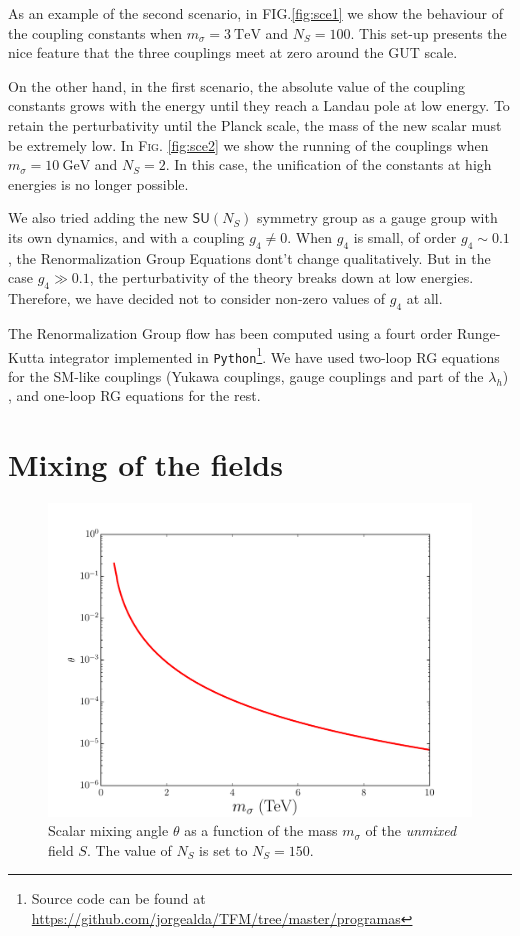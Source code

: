 \documentclass[aps,prd,preprintnumbers,nofootinbibn,twocolumn]{revtex4}
\begin{document}
As an example of the second scenario, in \textsc{FIG.}\ref{fig:sce1} we show the behaviour of the coupling constants when $m_\sigma = \SI{3}{\tera\electronvolt}$ and $N_S = 100$. This set-up presents the nice feature that the three couplings meet at zero around the GUT scale. 



On the other hand, in the first scenario, the absolute value of the coupling constants grows with the energy until they reach a Landau pole at low energy. To retain the perturbativity until the Planck scale, the mass of the new scalar must be extremely low. In \textsc{Fig.} \ref{fig:sce2} we show the running of the couplings when $m_\sigma =\SI{10}{\giga\electronvolt}$ and $N_S = 2$. In this case, the unification of the constants at high energies is no longer possible. 




We also tried adding the new $\mathsf{SU}(N_S)$ symmetry group as a gauge group with its own dynamics, and with a coupling $g_4\neq 0$. When $g_4$ is small, of order $g_4\sim 0.1$, the Renormalization Group Equations dont't change qualitatively. But in the case $g_4 \gg 0.1$, the perturbativity of the theory breaks down at low energies. Therefore, we have decided not to consider non-zero values of $g_4$ at all.

The Renormalization Group flow has been computed using a fourt order Runge-Kutta integrator implemented in \texttt{Python}\footnote{Source code can be found at \url{https://github.com/jorgealda/TFM/tree/master/programas}}. We have used two-loop RG equations for the SM-like couplings (Yukawa couplings, gauge couplings and part of the $\lambda_h$)\cite{Arason:1991ic} , and one-loop RG equations for the rest.

\section{Mixing of the fields} \label{sec:mixing}
\begin{figure}[t]
\centering
\includegraphics[width=\columnwidth]{angle}
\caption{Scalar mixing angle $\theta$ as a function of the mass $m_\sigma$ of the \textit{unmixed} field $S$. The value of $N_S$ is set to $N_S=150$.}\label{fig:angle}
\end{figure}
\end{document}
